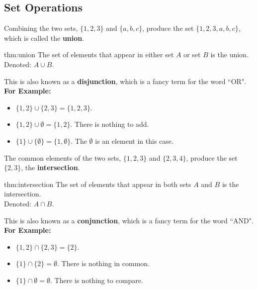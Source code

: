 \subsection{Set Operations}


Combining the two sets, $\{1,2,3\}$ and $\{a,b,c\}$, produce the set $\{1,2,3,a,b,c\}$, which
is called the \textbf{union}.\\

\begin{theo}[Union]{thm:union}
    The set of elements that appear in either set $A$ or set $B$ is the union.\\
    Denoted: $A \cup B$.
\end{theo}

\noindent
This is also known as a \textbf{disjunction}, which is a fancy term for the word ``OR".\\

\noindent
\textbf{For Example:}
\begin{itemize}
    \item $\{1, 2\} \cup \{2, 3\} = \{1, 2, 3\}$.
    \item $\{1,2\} \cup \emptyset = \{1, 2\}$. There is nothing to add.
    \item $\{1\} \cup \{\emptyset\} = \{1, \emptyset\}$. The $\emptyset$ is an element in this case.
\end{itemize}

\newpage
\noindent
The common elements of the two sets, $\{1,2,3\}$ and $\{2,3,4\}$, produce the set $\{2,3\}$,
the \textbf{intersection}.\\

\begin{theo}[Intersection]{thm:intersection}
    The set of elements that appear in both sets $A$ and $B$ is the intersection.\\
    Denoted: $A \cap B$.
\end{theo}

\noindent
This is also known as a \textbf{conjunction}, which is a fancy term for the word ``AND".\\

\noindent
\textbf{For Example:}
\begin{itemize}
    \item $\{1, 2\} \cap \{2, 3\} = \{2\}$.
    \item $\{1\} \cap \{2\} = \emptyset$. There is nothing in common.
    \item $\{1\} \cap \emptyset = \emptyset$. There is nothing to compare.
\end{itemize}

